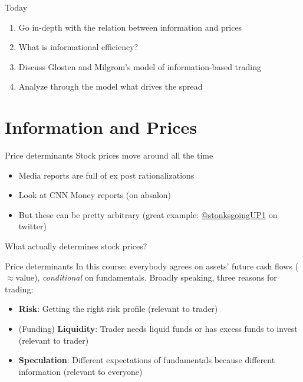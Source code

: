 \documentclass[english,10pt
,aspectratio=169
]{beamer}
\begin{document}
\begin{frame}{Today}
\begin{enumerate}
	\item Go in-depth with the relation between information and prices
	\item What is informational efficiency?
	\item Discuss Glosten and Milgrom's model of information-based trading
	\item Analyze through the model what drives the spread 
\end{enumerate}
\end{frame}



\section{Information and Prices}

\begin{frame}{Price determinants}
	Stock prices move around all the time
	\begin{itemize}
		\item Media reports are full of ex post rationalizations 
		\item Look at CNN Money reports (on absalon)
		\item But these can be pretty arbitrary (great example: \href{https://twitter.com/stonksgoingUP1}{@stonksgoingUP1} on twitter)
	\end{itemize}
	What actually determines stock prices?
\end{frame}


\begin{frame}{Price determinants}
	In this course: everybody agrees on assets' future cash flows ($\approx$value), \textit{conditional} on fundamentals. Broadly speaking, three reasons for trading:
	\begin{itemize}
		\item \textbf{Risk}: Getting the right risk profile (relevant to trader)
		\item (Funding) \textbf{Liquidity}: Trader needs liquid funds or has excess funds to invest (relevant to trader)
		\item \textbf{Speculation}: Different expectations of fundamentals because different \alert{information} (relevant to everyone)
	\end{itemize}
\end{frame}
\end{document}
